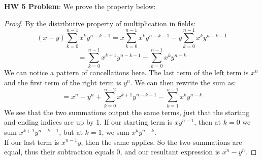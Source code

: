 \documentclass{article}
\begin{document}
\textbf{HW 5 Problem}: We prove the property below:
\begin{proof}
By the distributive property of multiplication in fields:
\begin{equation*}
    (x-y)\sum_{k=0}^{n-1}x^k y^{n-k-1} = x\sum_{k=0}^{n-1}x^k y^{n-k-1} - y\sum_{k=0}^{n-1}x^k y^{n-k-1}
\end{equation*}
\begin{equation*}
    = \sum_{k=0}^{n-1}x^{k+1} y^{n-k-1} - \sum_{k=0}^{n-1}x^k y^{n-k}
\end{equation*}
We can notice a pattern of cancellations here. The last term of the left term is $x^n$ and the first term of the right term is $y^n$. We can then rewrite the sum as:
\begin{equation*}
    = x^n - y^n + \sum_{k=0}^{n-2}x^{k+1} y^{n-k-1} - \sum_{k=1}^{n-1}x^k y^{n-k}
\end{equation*}
We see that the two summations output the same terms, just that the starting and ending indices are up by 1. If our starting term is $x y^{n-1}$, then at $k=0$ we sum $x^{k+1}y^{n-k-1}$, but at $k=1$, we sum $x^k y^{n-k}$.\\

If our last term is $x^{n-1}y$, then the same applies. So the two summations are equal, thus their subtraction equals 0, and our resultant expression is $x^n - y^n$.
\end{proof}
\end{document}
